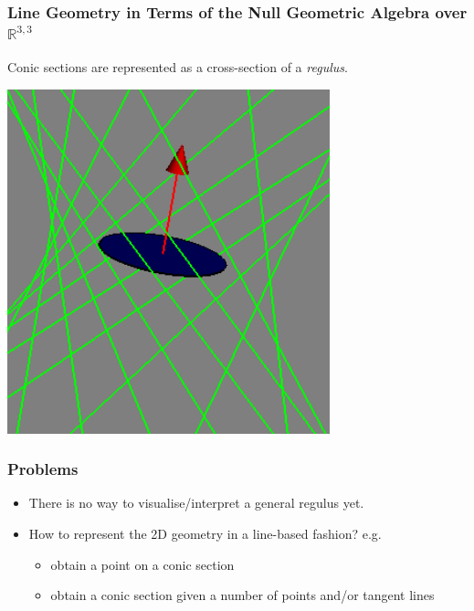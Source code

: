 \documentclass{beamer}
\newcommand{\rp}{$\mathbb{R}^{3,3}$}
\begin{document}
  \begin{frame}
    \frametitle{Line Geometry in Terms of the Null
Geometric Algebra over \rp\cite{hangbo2011}}
    Conic sections are represented as a cross-section of a \emph{regulus}.
    \begin{center}
      \includegraphics[width=0.7\textwidth]{axis.png}
    \end{center}
  \end{frame}
  

  \begin{frame}
    \frametitle{Problems}
    \begin{itemize}
      \item There is no way to visualise/interpret a general regulus yet.
      \item How to represent the 2D geometry in a line-based fashion?
        e.g.
        \begin{itemize}
          \item obtain a point on a conic section
          \item obtain a conic section given a number of points
            and/or tangent lines
        \end{itemize}
    \end{itemize}
  \end{frame}
  
\end{document}
